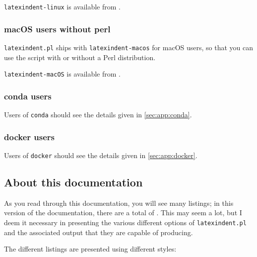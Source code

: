  \texttt{latexindent-linux} is available from \cite{latexindent-home}.

\subsubsection{macOS users without perl}
 \texttt{latexindent.pl} ships with \texttt{latexindent-macos} for macOS
 users, so that you can use the script with or without a Perl distribution.
   

 \texttt{latexindent-macOS} is available from \cite{latexindent-home}.

\subsubsection{conda users}
 Users of \texttt{conda} should see the details given in \cref{sec:app:conda}.

\subsubsection{docker users}
 Users of \texttt{docker} should see the details given in \cref{sec:app:docker}.

\subsection{About this documentation}
 As you read through this documentation, you will see many listings; in this version of
 the documentation, there are a total of \totallstlistings. This may seem a lot, but I
 deem it necessary in presenting the various different options of \texttt{latexindent.pl}
 and the associated output that they are capable of producing.

 The different listings are presented using different styles:

